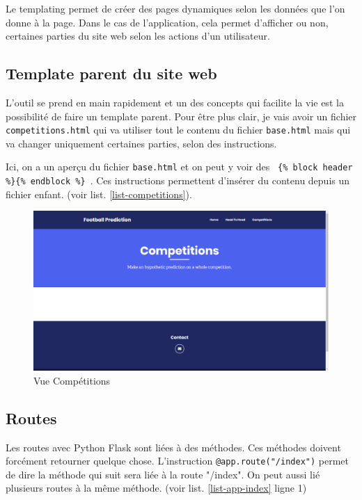 \documentclass[a4paper,14pt]{extarticle}
\begin{document}
{Le templating permet de créer des pages dynamiques selon les données que l'on donne à la page. Dans le cas de l'application, cela permet d'afficher ou non, certaines parties du site web selon les actions d'un utilisateur.

\subsection{Template parent du site web}

L'outil se prend en main rapidement et un des concepts qui facilite la vie est la possibilité de faire un template parent. Pour être plus clair, je vais avoir un fichier \texttt{competitions.html} qui va utiliser tout le contenu du fichier \texttt{base.html} mais qui va changer uniquement certaines parties, selon des instructions.

Ici, on a un aperçu du fichier \texttt{base.html} et on peut y voir des \texttt{ \{\% block header \%\}\{\% endblock \%\} }. Ces instructions permettent d'insérer du contenu depuis un fichier enfant. (voir list.  \ref{list-competitions}).



\begin{figure}[htp]
    \centering
    \includegraphics[width=15cm]{../img/apercuVueCompetitions.png}
    \caption{Vue Compétitions}
    \label{fig:vueCompetitions}
\end{figure}

\subsection{Routes}

Les routes avec Python Flask sont liées à des méthodes. Ces méthodes doivent forcément retourner quelque chose. L'instruction \texttt{@app.route("/index")} permet de dire la méthode qui suit sera liée à la route "/index". On peut aussi lié plusieurs routes à la même méthode. (voir list. \ref{list-app-index} ligne 1)

}
\end{document}
